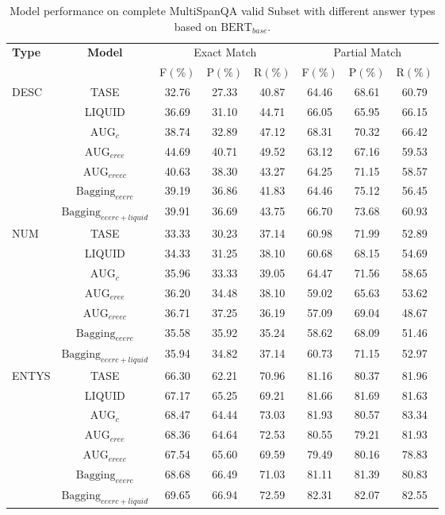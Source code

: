 \begin{table*}[ht]
	\caption{Model performance on complete MultiSpanQA valid Subset with different answer types based on $\text{BERT}_{base}$.}
	\label{tab:bertsub}
	\begin{tabular*}{\textwidth}{@{\extracolsep{\fill}}lccccccc}
		\toprule
		\multirow{2}{*}{\textbf{Type}} & \multirow{2}{*}{\textbf{Model}} & \multicolumn{3}{c}{Exact Match} & \multicolumn{3}{c}{Partial Match} \\
		\cmidrule{3-8} 
		& & F\((\%)\) & P\((\%)\) & R\((\%)\) & F\((\%)\) & P\((\%)\) & R\((\%)\) \\
		\midrule
		\multirow{6}{*}{DESC} & TASE & 32.76 & 27.33 & 40.87 & 64.46 & 68.61 & 60.79 \\ 
		& LIQUID & 36.69 & 31.10 & 44.71 & 66.05 & 65.95 & 66.15 \\
		& $\text{AUG}_{c}$ & 38.74 & 32.89 & 47.12 & 68.31 & 70.32 & 66.42 \\
		& $\text{AUG}_{eree}$ & 44.69 & 40.71 & 49.52 & 63.12 & 67.16 & 59.53 \\
		& $\text{AUG}_{ereec}$ & 40.63 & 38.30 & 43.27 & 64.25 & 71.15 & 58.57 \\
		& $\text{Bagging}_{eeerc}$ & 39.19  & 36.86 & 41.83 & 64.46 & 75.12 & 56.45 \\
		& $\text{Bagging}_{eeerc+liquid}$  & 39.91 & 36.69 & 43.75 & 66.70 & 73.68 & 60.93 \\
		\midrule
		\multirow{6}{*}{NUM} & TASE & 33.33 & 30.23 & 37.14 & 60.98 & 71.99 & 52.89 \\ 
		& LIQUID & 34.33 & 31.25 & 38.10 & 60.68 & 68.15 & 54.69 \\
		& $\text{AUG}_{c}$ & 35.96 & 33.33 & 39.05 & 64.47 & 71.56 & 58.65 \\
		& $\text{AUG}_{eree}$ & 36.20 & 34.48 & 38.10 & 59.02 & 65.63 & 53.62 \\
		& $\text{AUG}_{ereec}$ & 36.71 & 37.25 & 36.19 & 57.09 & 69.04 & 48.67 \\
		& $\text{Bagging}_{eeerc}$ & 35.58 & 35.92 & 35.24 & 58.62  & 68.09 & 51.46 \\
		& $\text{Bagging}_{eeerc+liquid}$  & 35.94 & 34.82 & 37.14 & 60.73 & 71.15 & 52.97 \\
		\midrule
		\multirow{6}{*}{ENTYS} & TASE & 66.30 & 62.21 & 70.96 & 81.16 & 80.37 & 81.96 \\ 
		& LIQUID & 67.17 & 65.25 & 69.21 & 81.66 & 81.69 & 81.63 \\
		& $\text{AUG}_{c}$ & 68.47 & 64.44 & 73.03 & 81.93 & 80.57 & 83.34 \\
		& $\text{AUG}_{eree}$ & 68.36 & 64.64 & 72.53 & 80.55 & 79.21 & 81.93 \\
		& $\text{AUG}_{ereec}$ & 67.54 & 65.60 & 69.59 & 79.49 & 80.16 & 78.83 \\
		& $\text{Bagging}_{eeerc}$ & 68.68  & 66.49 & 71.03 & 81.11 & 81.39 & 80.83 \\
		& $\text{Bagging}_{eeerc+liquid}$ & 69.65 & 66.94 & 72.59 & 82.31 & 82.07 & 82.55 \\
		\bottomrule
	\end{tabular*}
\end{table*}

